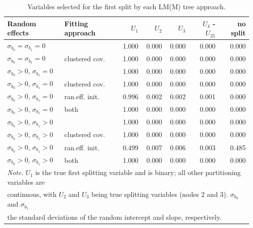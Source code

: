 \documentclass[doc,floatsintext,natbib]{apa7}
\begin{document}
\begin{table}[ht]
\caption{Variables selected for the first split by each LM(M) tree approach.} 
\label{tab:first_splits}
\begin{tabular}{llrrrrr}
  \hline
Random effects & Fitting approach & $U_1$ & $U_2$ & $U_3$ & $U_4$ - $U_{25}$ & no split \\ 
  \hline
$\sigma_{b_0} = \sigma_{b_1} = 0$ &  & 1.000 & 0.000 & 0.000 & 0.000 & 0.000 \\ 
  $\sigma_{b_0} = \sigma_{b_1} = 0$ & clustered cov. & 1.000 & 0.000 & 0.000 & 0.000 & 0.000 \\ 
   \hline
$\sigma_{b_0} > 0$, $\sigma_{b_1} = 0$ &  & 1.000 & 0.000 & 0.000 & 0.000 & 0.000 \\ 
  $\sigma_{b_0} > 0$, $\sigma_{b_1} = 0$ & clustered cov. & 1.000 & 0.000 & 0.000 & 0.000 & 0.000 \\ 
  $\sigma_{b_0} > 0$, $\sigma_{b_1} = 0$ & ran.eff. init. & 0.996 & 0.002 & 0.002 & 0.001 & 0.000 \\ 
  $\sigma_{b_0} > 0$, $\sigma_{b_1} = 0$ & both & 1.000 & 0.000 & 0.000 & 0.000 & 0.000 \\ 
   \hline
$\sigma_{b_0} > 0$, $\sigma_{b_1} > 0$ &  & 1.000 & 0.000 & 0.000 & 0.000 & 0.000 \\ 
  $\sigma_{b_0} > 0$, $\sigma_{b_1} > 0$ & clustered cov. & 1.000 & 0.000 & 0.000 & 0.000 & 0.000 \\ 
  $\sigma_{b_0} > 0$, $\sigma_{b_1} > 0$ & ran.eff. init. & 0.499 & 0.007 & 0.006 & 0.003 & 0.485 \\ 
  $\sigma_{b_0} > 0$, $\sigma_{b_1} > 0$ & both & 1.000 & 0.000 & 0.000 & 0.000 & 0.000 \\ 
   \hline \multicolumn{7}{l}{\footnotesize\textit{Note.} $U_1$ is the true first splitting variable and is binary; all other partitioning variables are}\\  \multicolumn{7}{l}{\footnotesize continuous, with $U_2$ and $U_3$ being true splitting variables (nodes 2 and 3). $\sigma_{b_0}$ and $\sigma_{b_1}$} are\\  \multicolumn{7}{l}{\footnotesize the standard deviations of the random intercept and slope, respectively.}\\ \end{tabular}
\end{table}
\FloatBarrier
\end{document}
